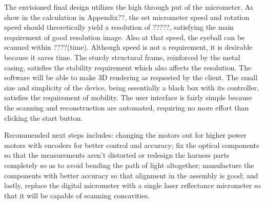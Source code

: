 \documentclass{article}
\begin{document}
The envisioned final design utilizes the high through put of the micrometer. As show in the calculation in 
Appendix??, the set micrometer speed and rotation speed should theoretically yield a resolution of ?????, 
satisfying the main requirement of good resolution image. Also at that speed, the eyeball can be scanned 
within ????(time). Although speed is not a requirement, it is desirable because it saves time. The sturdy 
structural frame, reinforced by the metal casing, satisfies the stability requirement which also affects the 
resolution. The software will be able to make 3D rendering as requested by the client. The small size and 
simplicity of the device, being essentially a black box with its controller, satisfies the requirement of 
mobility. The user interface is fairly simple because the scanning and reconstruction are automated, 
requiring no more effort than clicking the start button. 

Recommended next steps includes: changing the motors out for higher power motors with encoders for 
better control and accuracy; fix the optical components so that the measurements aren't distorted or 
redesign the harness parts completely so as to avoid bending the path of light altogether; manufacture the 
components with better accuracy so that alignment in the assembly is good; and lastly, replace the digital 
micrometer with a single laser reflectance micrometer so that it will be capable of scanning concavities.


\newpage
{}


\end{document}
